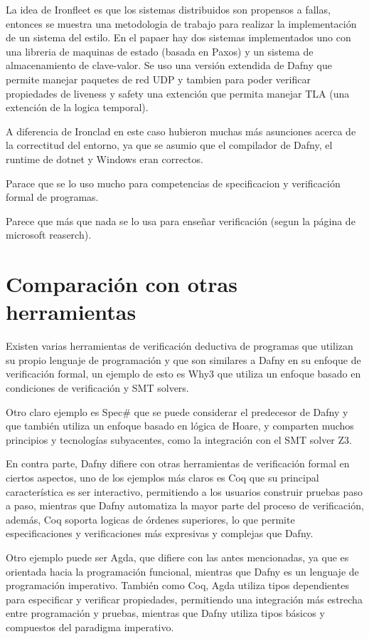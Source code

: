 \documentclass[runningheads]{llncs}
\begin{document}
La idea de Ironfleet\cite{hawblitzel2015ironfleet} es que los sistemas distribuidos son propensos a fallas, entonces se muestra una metodologia de trabajo para realizar la implementación de un sistema del estilo. En el papaer hay dos sistemas implementados uno con una libreria de maquinas de estado (basada en Paxos) y un sistema de almacenamiento de clave-valor.
Se uso una versión extendida de Dafny que permite manejar paquetes de red UDP y tambien para poder verificar propiedades de liveness y safety una extención que permita manejar TLA (una extención de la logica temporal).

A diferencia de Ironclad en este caso hubieron muchas más asunciones acerca de la correctitud del entorno, ya que se asumio que el compilador de Dafny, el runtime de dotnet y Windows eran correctos.


Parace que se lo uso mucho para competencias de specificacion y verificación formal de programas.

Parece que más que nada se lo usa para enseñar verificación (segun la página de microsoft reaserch).

\section{Comparación con otras herramientas}

Existen varias herramientas de verificación deductiva de programas que utilizan su propio lenguaje de programación 
y que son similares a Dafny en su enfoque de verificación formal, 
un ejemplo de esto es Why3 que utiliza un enfoque basado en condiciones de verificación y SMT solvers.

Otro claro ejemplo es Spec\# que se puede considerar el predecesor de Dafny y que también utiliza un enfoque basado en lógica de Hoare,
y comparten muchos principios y tecnologías subyacentes, como la integración con el SMT solver Z3.

En contra parte, Dafny difiere con otras herramientas de verificación formal en ciertos aspectos, uno de los ejemplos más claros es Coq 
que su principal característica es ser interactivo, 
permitiendo a los usuarios construir pruebas paso a paso, mientras que Dafny automatiza la mayor parte del proceso de verificación,
además, Coq soporta logicas de órdenes superiores, lo que permite especificaciones y verificaciones más expresivas y complejas que Dafny.

Otro ejemplo puede ser Agda, que difiere con las antes mencionadas, ya que 
es orientada hacia la programación funcional, mientras que Dafny es un lenguaje de programación imperativo. 
También como Coq, Agda utiliza tipos dependientes para especificar y verificar propiedades, 
permitiendo una integración más estrecha entre programación y pruebas, mientras que Dafny utiliza tipos básicos y compuestos del paradigma imperativo.
\end{document}
